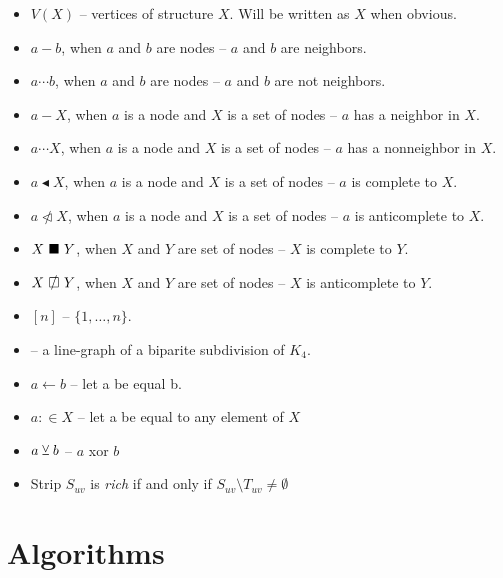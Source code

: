 \documentclass{report}
\begin{document}
\begin{itemize}
	\item $V(X)$ -- vertices of structure $X$. Will be written as $X$ when obvious.
	\item $a - b$, when $a$ and $b$ are nodes -- $a$ and $b$ are neighbors.
	\item $a \cdots b$, when $a$ and $b$ are nodes -- $a$ and $b$ are not neighbors.
	\item $a - X$, when $a$ is a node and $X$ is a set of nodes -- $a$ has a neighbor in $X$.
	\item $a \cdots X$, when $a$ is a node and $X$ is a set of nodes -- $a$ has a nonneighbor in $X$.
	\item $a \blacktriangleleft  X$, when $a$ is a node and $X$ is a set of nodes -- $a$ is complete to $X$.
	\item $a \ntriangleleft X$, when $a$ is a node and $X$ is a set of nodes -- $a$ is anticomplete to $X$.
	\item $X \ \blacksquare\  Y$, when $X$ and $Y$ are set of nodes -- $X$ is complete to $Y$.
	\item $X \setAntiComplete Y$, when $X$ and $Y$ are set of nodes -- $X$ is anticomplete to $Y$.
	\item $[n]$  -- $\{1, \ldots, n\}$.
	\item \LGBSK -- a line-graph of a biparite subdivision of $K_4$.
	\item $a \gets b$ -- let a be equal b.
	\item $a :\in X$ -- let a be equal to any element of $X$
	\item $a \veebar b$ -- $a$ xor $b$

	\item Strip $S_{uv}$ is \emph{rich} if and only if $S_{uv} \setminus T_{uv} \neq \emptyset$
\end{itemize}

\section{Algorithms}


\clearpage


\clearpage

% 

% 
\end{document}
